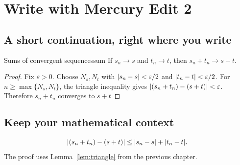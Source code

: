 \chapter{Write with Mercury Edit 2}
\section{A short continuation, right where you write}
\begin{theorem}{Sums of convergent sequences}{sum}
If $s_n\to s$ and $t_n\to t$, then $s_n+t_n\to s+t$.
\end{theorem}
\begin{proof}
Fix $\varepsilon>0$. Choose $N_s,N_t$ with
$\lvert s_n-s\rvert<\varepsilon/2$ and $\lvert t_n-t\rvert<\varepsilon/2$.
For $n\geq\max\{N_s,N_t\}$, the triangle inequality gives
$\lvert(s_n+t_n)-(s+t)\rvert<\varepsilon$.
Therefore $s_n+t_n$ converges to $s+t$
\end{proof}
\section{Keep your mathematical context}
\begin{equation}\label{eq:sum}
 \lvert(s_n+t_n)-(s+t)\rvert\leq\lvert s_n-s\rvert+\lvert t_n-t\rvert.
\end{equation}
The proof uses Lemma~\ref{lem:triangle} from the previous chapter.
